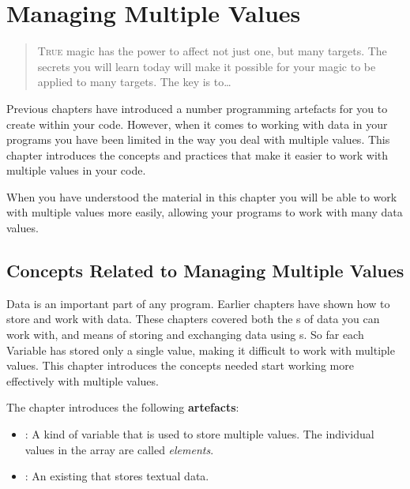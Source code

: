 \chapter{Managing Multiple Values} %
\label{cha:managing_multiple_values}

\begin{quote}
  \Fontlukas\Large
  \renewcommand{\LettrineTextFont}{\relax}
  \lettrine[image=true,lines=3,lraise=0.1]
  {T}{rue} magic has the power to affect not just one, but many targets. The secrets you will learn today will make it possible for your magic to be applied to many targets. The key is to\ldots
\end{quote}

\bigskip


Previous chapters have introduced a number programming artefacts for you to create within your code. However, when it comes to working with data in your programs you have been limited in the way you deal with multiple values. This chapter introduces the concepts and practices that make it easier to work with multiple values in your code.

When you have understood the material in this chapter you will be able to work with multiple values more easily, allowing your programs to work with many data values. 

\minitoc

\clearpage
\section{Concepts Related to Managing Multiple Values} %
\label{sec:managing_multiple_values_concepts}

Data is an important part of any program. Earlier chapters have shown how to store and work with data. These chapters covered both the s of data you can work with, and means of storing and exchanging data using s. So far each Variable has stored only a single value, making it difficult to work with multiple values. This chapter introduces the concepts needed start working more effectively with multiple values.

The chapter introduces the following \textbf{artefacts}:
\begin{itemize}
  \item {}: A kind of variable that is used to store multiple values. The individual values in the array are called \emph{elements}.
  \item {}: An existing  that stores textual data.
\end{itemize}

